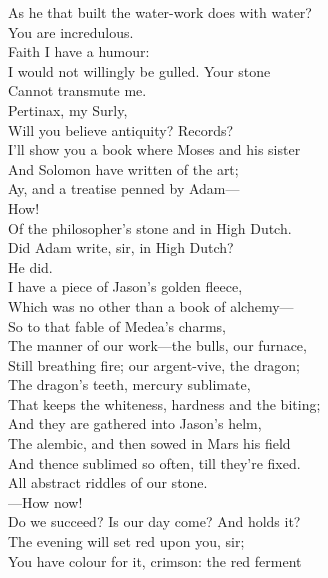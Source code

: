 \documentclass[a4paper,oneside,12pt]{memoir}
\begin{document}
\begin{drama*}
\surlyspeaks As he that built the water-work does with water?\\
\mammonspeaks You are incredulous.\\
\surlyspeaks {} Faith I have a humour:\\
I would not willingly be gulled. Your stone\\
Cannot transmute me.\\
\mammonspeaks {} Pertinax, my Surly,\\
Will you believe antiquity? Records?\\
I'll show you a book where Moses and his sister\\
And Solomon have written of the art;\\
Ay, and a treatise penned by Adam---\\
\surlyspeaks {} How!\\
\mammonspeaks Of the philosopher's stone and in High Dutch.\\
\surlyspeaks Did Adam write, sir, in High Dutch?\\
\mammonspeaks {} He did.\\
I have a piece of Jason's golden fleece,\\
Which was no other than a book of alchemy---\\
So to that fable of Medea's charms,\\
The manner of our work---the bulls, our furnace,\\
Still breathing fire; our argent-vive, the dragon;\\
The dragon's teeth, mercury sublimate,\\
That keeps the whiteness, hardness and the biting;\\
And they are gathered into Jason's helm,\\
The alembic, and then sowed in Mars his field\\
And thence sublimed so often, till they're fixed.\\
All abstract riddles of our stone.\\
 ---How now!\\
Do we succeed? Is our day come? And holds it?\\
\facespeaks The evening will set red upon you, sir;\\
You have colour for it, crimson: the red ferment\\

\end{drama*}
\end{document}
